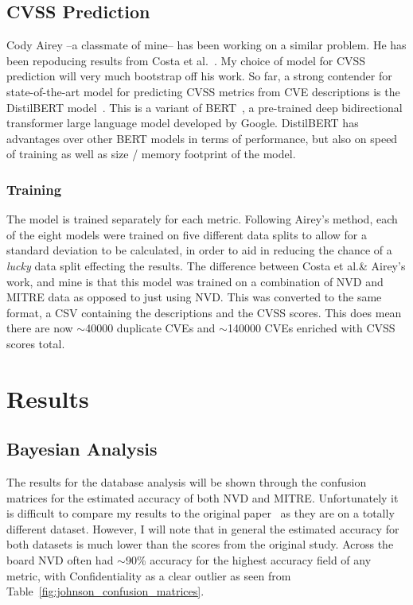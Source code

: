 \documentclass[12pt]{article}
\begin{document}
\subsection{CVSS Prediction} \label{cvss_prediction}

Cody Airey --a classmate of mine-- has been working on a similar problem. He has been repoducing
results from Costa et al.\@~\cite{costa}. My choice of model for CVSS prediction will very much
bootstrap off his work. So far, a strong contender for state-of-the-art model for predicting CVSS
metrics from CVE descriptions is the DistilBERT model~\cite{distilbert}. This is a variant of
BERT~\cite{BERT}, a pre-trained deep bidirectional transformer large language model developed by
Google. DistilBERT has advantages over other BERT models in terms of performance, but also on speed
of training as well as size / memory footprint of the model.

\subsubsection{Training}

The model is trained separately for each metric. Following Airey's method, each of the eight models
were trained on five different data splits to allow for a standard deviation to be calculated, in
order to aid in reducing the chance of a \textit{lucky} data split effecting the results. The
difference between Costa et al.\@ \& Airey's work, and mine is that this model was trained on a
combination of NVD and MITRE data as opposed to just using NVD. This was converted to the same
format, a CSV containing the descriptions and the CVSS scores. This does mean there are now
$\sim$40000 duplicate CVEs and $\sim$140000 CVEs enriched with CVSS scores total.

\section{Results}

\subsection{Bayesian Analysis}

The results for the database analysis will be shown through the confusion matrices for the estimated
accuracy of both NVD and MITRE. Unfortunately it is difficult to compare my results to the original
paper~\cite{bayes} as they are on a totally different dataset. However, I will note that in general the estimated
accuracy for both datasets is much lower than the scores from the original study. Across the board NVD
often had $\sim$90\% accuracy for the highest accuracy field of any metric, with Confidentiality as
a clear outlier as seen from Table~\ref{fig:johnson_confusion_matrices}.
\end{document}
